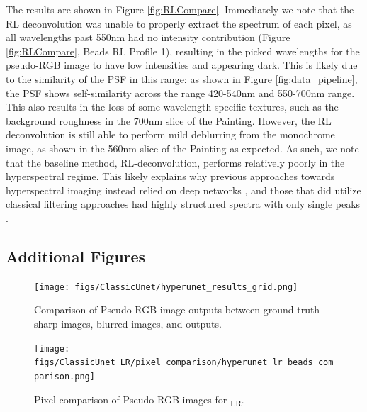\documentclass{article}
\begin{document}
The results are shown in Figure \ref{fig:RLCompare}. Immediately we note that the RL deconvolution was unable to properly extract the spectrum of each pixel, as all wavelengths past 550nm had no intensity contribution (Figure \ref{fig:RLCompare}, Beads RL Profile 1), resulting in the picked wavelengths for the pseudo-RGB image to have low intensities and appearing dark. This is likely due to the similarity of the PSF in this range: as shown in Figure \ref{fig:data_pipeline}, the PSF shows self-similarity across the range 420-540nm and 550-700nm range. This also results in the loss of some wavelength-specific textures, such as the background roughness in the 700nm slice of the Painting. However, the RL deconvolution is still able to perform mild deblurring from the monochrome image, as shown in the 560nm slice of the Painting as expected. As such, we note that the baseline method, RL-deconvolution, performs relatively poorly in the hyperspectral regime. This likely explains why previous approaches towards hyperspectral imaging instead relied on deep networks \cite{jeon2019compact}, and those that did utilize classical filtering approaches had highly structured spectra with only single peaks \cite{zhan2019hyperspectral}.

\subsection{Additional Figures}

\begin{figure}[!h]
\centering
\texttt{[image: figs/ClassicUnet/hyperunet\_results\_grid.png]}
    \caption{Comparison of Pseudo-RGB image outputs between ground truth sharp images, blurred images, and  outputs.}
    \label{fig:HyperUnet_results_grid}
\end{figure}


\begin{figure}[!h]
\centering
\texttt{[image: figs/ClassicUnet\_LR/pixel\_comparison/hyperunet\_lr\_beads\_comparison.png]}
    \caption{Pixel comparison of Pseudo-RGB images for \textsubscript{LR}.}
    \label{fig:hyperunet_lr_beads}
\end{figure}
\end{document}
